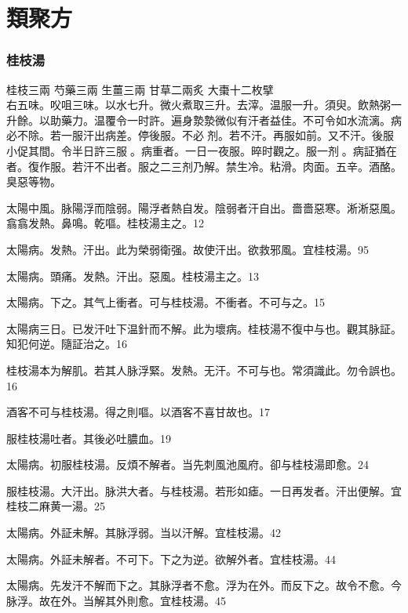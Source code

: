 





\mainmatter

\part{類聚方}

\section{桂枝湯}

桂枝{\scriptsize 三兩} 芍藥{\scriptsize 三兩} 生薑{\scriptsize 三兩} 甘草{\scriptsize 二兩炙} 大棗{\scriptsize 十二枚擘}\\
右五味。㕮咀三味。以水七升。微火煮取三升。去滓。温服一升。須臾。飲熱粥一升餘。以助藥力。温覆令一时許。遍身漐漐微似有汗者益佳。不可令如水流漓。病必不除。若一服汗出病差。停後服。不必{\sungtpii 𥁞}剂。若不汗。再服如前。又不汗。後服小促其間。令半日許三服{\sungtpii 𥁞}。病重者。一日一夜服。晬时觀之。服一剂{\sungtpii 𥁞}。病証猶在者。復作服。若汗不出者。服之二三剂乃解。{\khaaitp 禁生冷。粘滑。肉面。五辛。酒酪。臭惡等物。}

太陽中風。{\khaaitp 脉}陽浮而陰弱。陽浮者熱自发。陰弱者汗自出。嗇嗇惡寒。淅淅惡風。翕翕发熱。鼻鳴。乾嘔。桂枝湯主之。12

太陽病。发熱。汗出。此为榮弱衛强。故使汗出。欲救邪風。宜桂枝湯。95

太陽病。頭痛。发熱。汗出。惡風。桂枝湯主之。13

太陽病。下之。其气上衝者。可与桂枝湯。不衝者。不可与之。15

太陽病三日。已发汗吐下温針而不解。此为壞病。桂枝湯不復中与也。觀其脉証。知犯何逆。隨証治之。16

桂枝湯本为解肌。若其人脉浮緊。发熱。无汗。不可与也。常須識此。勿令誤也。16

酒客不可与桂枝湯。得之則嘔。以酒客不喜甘故也。17

服桂枝湯吐者。其後必吐膿血。19

太陽病。初服桂枝湯。反煩不解者。当先刺風池風府。卻与桂枝湯即愈。24

服桂枝湯。大汗出。脉洪大者。与桂枝湯。若形如瘧。一日再发者。汗出便解。宜桂枝二麻黄一湯。25

太陽病。外証未解。其脉浮弱。当以汗解。宜桂枝湯。42

太陽病。外証未解者。不可下。下之为逆。欲解外者。宜桂枝湯。44

太陽病。先发汗不解而下之。其脉浮者不愈。浮为在外。而反下之。故令不愈。今脉浮。故在外。当解其外則愈。宜桂枝湯。45

